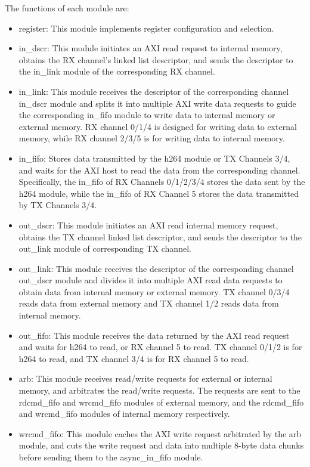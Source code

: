 \documentclass[main\_\_EN.tex]{subfiles}
\begin{document}
The functions of each module are:
\begin{itemize}
    \item register: This module implements register configuration and selection.
    \item in\_dscr: This module initiates an AXI read request to internal memory, obtains the RX channel's linked list descriptor, and sends the descriptor to the in\_link module of the corresponding RX channel.
    \item in\_link: This module receives the descriptor of the corresponding channel in\_dscr module and splits it into multiple AXI write data requests to guide the corresponding in\_fifo module to write data to internal memory or external memory. RX channel 0/1/4 is designed for writing data to external memory, while RX channel 2/3/5 is for writing data to internal memory.
    \item in\_fifo: Stores data transmitted by the h264 module or TX Channels 3/4, and waits for the AXI host to read the data from the corresponding channel. Specifically, the in\_fifo of RX Channels 0/1/2/3/4 stores the data sent by the h264 module, while the in\_fifo of RX Channel 5 stores the data transmitted by TX Channels 3/4.
    \item out\_dscr: This module initiates an AXI read internal memory request, obtains the TX channel linked list descriptor, and sends the descriptor to the out\_link module of corresponding TX channel.
    \item out\_link: This module receives the descriptor of the corresponding channel out\_dscr module and divides it into multiple AXI read data requests to obtain data from internal memory or external memory. TX channel 0/3/4 reads data from external memory and TX channel 1/2 reads data from internal memory.
    \item out\_fifo: This module receives the data returned by the AXI read request and waits for h264 to read, or RX channel 5 to read. TX channel 0/1/2 is for h264 to read, and TX channel 3/4 is for RX channel 5 to read.
    \item arb: This module receives read/write requests for external or internal memory, and arbitrates the read/write requests. The requests are sent to the rdcmd\_fifo and wrcmd\_fifo modules of external memory, and the rdcmd\_fifo and wrcmd\_fifo modules of internal memory respectively.
    \item wrcmd\_fifo: This module caches the AXI write request arbitrated by the arb module, and cuts the write request and data into multiple 8-byte data chunks before sending them to the async\_in\_fifo module.

\end{itemize}
\end{document}
